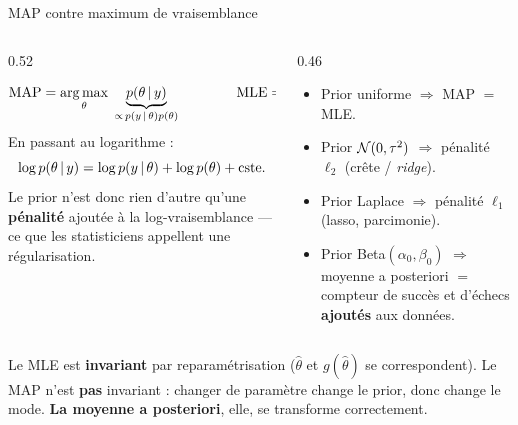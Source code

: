 \begin{frame}{MAP contre maximum de vraisemblance}
\small
\vspace{-1mm}
\begin{columns}[t]
\begin{column}{0.52\textwidth}
\begin{kbox}
\[
\text{MAP} = \operatorname*{arg\,max}_\theta \; \underbrace{p(\theta \,\vert\, y)}_{\propto\, p(y \,\vert\, \theta) p(\theta)}
\qquad\qquad
\text{MLE} = \operatorname*{arg\,max}_\theta \; p(y \,\vert\, \theta)
\]
En passant au logarithme :
\[
\log p(\theta \,\vert\, y) = \log p(y \,\vert\, \theta) + \log p(\theta) + \text{cste}.
\]
Le prior n'est donc rien d'autre qu'une \textbf{pénalité} ajoutée à la
log-vraisemblance --- ce que les statisticiens appellent une régularisation.
\end{kbox}
\end{column}
\begin{column}{0.46\textwidth}
\begin{ebox}
\begin{itemize}
  \item Prior uniforme $\Rightarrow$ MAP $=$ MLE.
  \item Prior $\mathcal{N}(0, \tau^2)$ $\Rightarrow$ pénalité $\ell_2$
        (crête / \textit{ridge}).
  \item Prior Laplace $\Rightarrow$ pénalité $\ell_1$
        (lasso, parcimonie).
  \item Prior Beta$(\alpha_0, \beta_0)$ $\Rightarrow$ moyenne a posteriori
        $=$ compteur de succès et d'échecs \textbf{ajoutés} aux données.
\end{itemize}
\end{ebox}
\end{column}
\end{columns}
\vspace{1mm}
\begin{wbox}
Le MLE est \textbf{invariant} par reparamétrisation ($\hat\theta$ et $g(\hat\theta)$ se correspondent). Le MAP
n'est \textbf{pas} invariant : changer de paramètre change le prior, donc change
le mode. \textbf{La moyenne a posteriori}, elle, se transforme correctement.
\end{wbox}
\end{frame}

